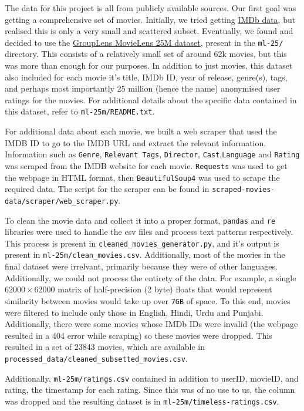 \documentclass[11pt]{article}
\begin{document}
The data for this project is all from publicly available sources. Our
first goal was getting a comprehensive set of movies. Initially, we
tried getting \href{https://www.imdb.com/interfaces/}{IMDb data}, but
realised this is only a very small and scattered subset. Eventually, we
found and decided to use the
\href{https://grouplens.org/datasets/movielens/}{GroupLens MovieLens 25M
dataset}, present in the \texttt{ml-25/} directory. This consists of a
relatively small set of around 62k movies, but this was more than enough
for our purposes. In addition to just movies, this dataset also included
for each movie it's title, IMDb ID, year of release, genre(s), tags, and
perhaps most importantly 25 million (hence the name) anonymised user
ratings for the movies. For additional details about the specific data
contained in this dataset, refer to \texttt{ml-25m/README.txt}.

    For additional data about each movie, we built a web scraper that used
the IMDB ID to go to the IMDB URL and extract the relevant information.
Information such as \texttt{Genre}, \texttt{Relevant\ Tags},
\texttt{Director}, \texttt{Cast},\texttt{Language} and \texttt{Rating}
was scraped from the IMDB website for each movie. \texttt{Requests} was
used to get the webpage in HTML format, then \texttt{BeautifulSoup4} was
used to scrape the required data. The script for the scraper can be
found in \texttt{scraped-movies-data/scraper/web\_scraper.py}.

To clean the movie data and collect it into a proper format,
\texttt{pandas} and \texttt{re} libraries were used to handle the csv
files and process text patterns respectively. This process is present in
\texttt{cleaned\_movies\_generator.py}, and it's output is present in
\texttt{ml-25m/clean\_movies.csv}. Additionally, most of the movies in
the final dataset were irrelvant, primarily because they were of other
languages. Additionally, we could not process the entirety of the data.
For example, a single \(62000\times62000\) matrix of half-precision (2
byte) floats that would represent similarity between movies would take
up over \texttt{7GB} of space. To this end, movies were filtered to
include only those in English, Hindi, Urdu and Punjabi. Additionally,
there were some movies whose IMDb IDs were invalid (the webpage resulted
in a 404 error while scraping) so these movies were dropped. This
resulted in a set of 23843 movies, which are available in
\texttt{processed\_data/cleaned\_subsetted\_movies.csv}.

Additionally, \texttt{ml-25m/ratings.csv} contained in addition to
userID, movieID, and rating, the timestamp for each rating. Since this
was of no use to us, the column was dropped and the resulting dataset is
in \texttt{ml-25m/timeless-ratings.csv}.
\end{document}
